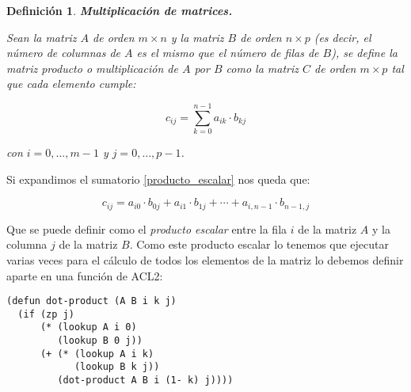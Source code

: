 \documentclass[a4paper,10pt]{article}
\newtheorem{defi}{{Definición}}
\begin{document}
\par \vspace{12pt}	

\begin{defi} \textbf{Multiplicación de matrices.}\vspace{8pt}\par
Sean la matriz $A$ de orden $m \times n$ y la matriz $B$ de orden $n \times p$ (es decir, el número de columnas de $A$ es el mismo que el número de filas de $B$), se define la \emph{matriz producto o multiplicación} de $A$ por $B$ como la matriz $C$ de orden $m \times p$ tal que cada elemento cumple:

\par \vspace{10pt}	

\begin{equation} 
c_{ij} = \sum^{n-1}_{k=0}{a_{ik}\cdot b_{kj}}
\label{producto_escalar}
\end{equation} 

\par \vspace{10pt}	

con $i = 0, \dots , m-1$ y $j= 0, \dots , p-1$.
\end{defi}

\par \vspace{10pt}

Si expandimos el sumatorio \ref{producto_escalar} nos queda que:

\begin{equation} 
c_{ij} = a_{i0}\cdot b_{0j} + a_{i1}\cdot b_{1j} + \cdots + a_{i,n-1}\cdot b_{n-1,j}
\label{producto_escalar_expandido}
\end{equation} 

\par \vspace{10pt}

Que se puede definir como el \emph{producto escalar} entre la fila $i$ de la matriz $A$ y la columna $j$ de la matriz $B$. Como este producto escalar lo tenemos que ejecutar varias veces para el cálculo de todos los elementos de la matriz lo debemos definir aparte en una función de ACL2:

\par \vspace{10pt}

\begin{lstlisting}[language=clips]
(defun dot-product (A B i k j)
  (if (zp j)
      (* (lookup A i 0)
         (lookup B 0 j))
      (+ (* (lookup A i k)
            (lookup B k j))
         (dot-product A B i (1- k) j))))
\end{lstlisting}
\end{document}
